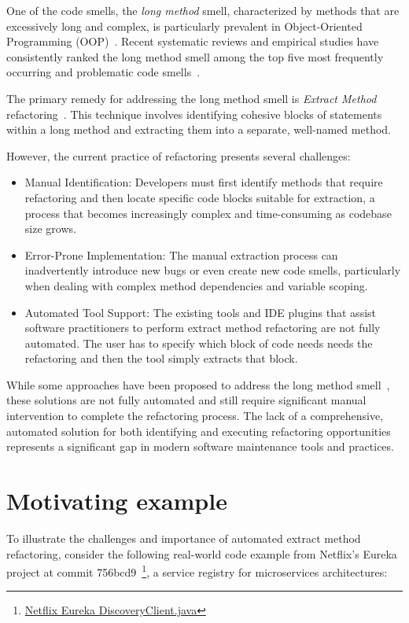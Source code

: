 One of the code smells, the \textit{long method} smell, characterized by methods that are excessively long and complex, is particularly prevalent in Object-Oriented Programming (OOP)~\cite{fowler2018refactoring, Sharma2018}. Recent systematic reviews and empirical studies have consistently ranked the long method smell among the top five most frequently occurring and problematic code smells~\cite{agnihotri2020systematic, lacerda2020code}.

The primary remedy for addressing the long method smell is \textit{Extract Method} refactoring~\cite{Fowler1999Refactoring}. This technique involves identifying cohesive blocks of statements within a long method and extracting them into a separate, well-named method.

However, the current practice of \exm{} refactoring presents several challenges:
\begin{itemize}
    \item {Manual Identification}: Developers must first identify methods that require refactoring and then locate specific code blocks suitable for extraction, a process that becomes increasingly complex and time-consuming as codebase size grows.
    \item {Error-Prone Implementation}: The manual extraction process can inadvertently introduce new bugs or even create new code smells, particularly when dealing with complex method dependencies and variable scoping.
    \item {Automated Tool Support}: The existing tools and IDE plugins that assist software practitioners to perform extract method refactoring are not fully automated. The user has to specify which block of code needs needs the refactoring and then the tool simply extracts that block.
\end{itemize}

While some approaches have been proposed to address the long method smell~\cite{maruyama2001automated, tsantalis2011identification, charalampidou2016identifying}, these solutions are not fully automated and still require significant manual intervention to complete the refactoring process. The lack of a comprehensive, automated solution for both identifying and executing \exm{} refactoring opportunities represents a significant gap in modern software maintenance tools and practices.

\section{Motivating example}
To illustrate the challenges and importance of automated extract method refactoring, consider the following real-world code example from Netflix's {Eureka} project at commit {756bcd9}~\footnote{\href{https://github.com/Netflix/eureka/blob/756bcd9fd308647c7b388543da9a3a6e034ee3f5/eureka-client/src/main/java/com/netflix/discovery/DiscoveryClient.java\#L865}{Netflix Eureka DiscoveryClient.java}}, a service registry for microservices architectures:

